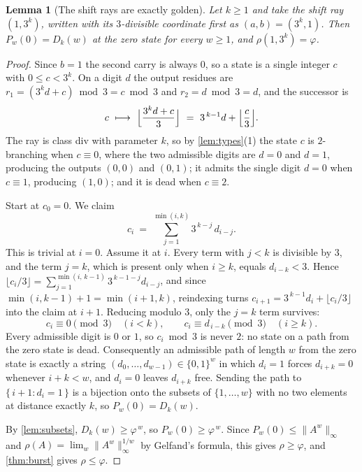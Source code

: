 \documentclass[11pt]{amsart}
\newtheorem{lemma}[theorem]{Lemma}
\theoremstyle{definition}
\theoremstyle{remark}
\begin{document}
\begin{lemma}[The shift rays are exactly golden]
\label{lem:shift}
Let $k \ge 1$ and take the shift ray $(1,3^k)$, written with its $3$-divisible coordinate first as $(a,b) = (3^k,1)$. Then $P_w(0) = D_k(w)$ at the zero state for every $w \ge 1$, and $\rho(1,3^k) = \varphi$.
\end{lemma}

\begin{proof}
Since $b = 1$ the second carry is always $0$, so a state is a single integer $c$ with $0 \le c < 3^k$. On a digit $d$ the output residues are $r_1 = (3^k d + c) \bmod 3 = c \bmod 3$ and $r_2 = d \bmod 3 = d$, and the successor is
\[
  c \ \longmapsto \ \Bigl\lfloor \frac{3^k d + c}{3} \Bigr\rfloor \ = \ 3^{\,k-1} d + \Bigl\lfloor \frac{c}{3} \Bigr\rfloor .
\]
The ray is class div with parameter $k$, so by \cref{lem:types}(1) the state $c$ is $2$-branching when $c \equiv 0$, where the two admissible digits are $d = 0$ and $d = 1$, producing the outputs $(0,0)$ and $(0,1)$; it admits the single digit $d = 0$ when $c \equiv 1$, producing $(1,0)$; and it is dead when $c \equiv 2$.

Start at $c_0 = 0$. We claim
\[
  c_i \ = \ \sum_{j=1}^{\min(i,k)} 3^{\,k-j}\, d_{i-j} .
\]
This is trivial at $i = 0$. Assume it at $i$. Every term with $j < k$ is divisible by $3$, and the term $j = k$, which is present only when $i \ge k$, equals $d_{i-k} < 3$. Hence $\lfloor c_i/3 \rfloor = \sum_{j=1}^{\min(i,\,k-1)} 3^{\,k-1-j} d_{i-j}$, and since $\min(i,k-1) + 1 = \min(i+1,k)$, reindexing turns $c_{i+1} = 3^{\,k-1} d_i + \lfloor c_i/3\rfloor$ into the claim at $i+1$. Reducing modulo $3$, only the $j = k$ term survives:
\[
  c_i \equiv 0 \pmod 3 \quad (i < k), \qquad c_i \equiv d_{\,i-k} \pmod 3 \quad (i \ge k).
\]
Every admissible digit is $0$ or $1$, so $c_i \bmod 3$ is never $2$: no state on a path from the zero state is dead. Consequently an admissible path of length $w$ from the zero state is exactly a string $(d_0,\dots,d_{w-1}) \in \{0,1\}^w$ in which $d_i = 1$ forces $d_{i+k} = 0$ whenever $i + k < w$, and $d_i = 0$ leaves $d_{i+k}$ free. Sending the path to $\{\,i+1 : d_i = 1\,\}$ is a bijection onto the subsets of $\{1,\dots,w\}$ with no two elements at distance exactly $k$, so $P_w(0) = D_k(w)$.

By \cref{lem:subsets}, $D_k(w) \ge \varphi^{\,w}$, so $P_w(0) \ge \varphi^{\,w}$. Since $P_w(0) \le \|A^w\|_\infty$ and $\rho(A) = \lim_{w} \|A^w\|_\infty^{1/w}$ by Gelfand's formula, this gives $\rho \ge \varphi$, and \cref{thm:burst} gives $\rho \le \varphi$.
\end{proof}
\end{document}
